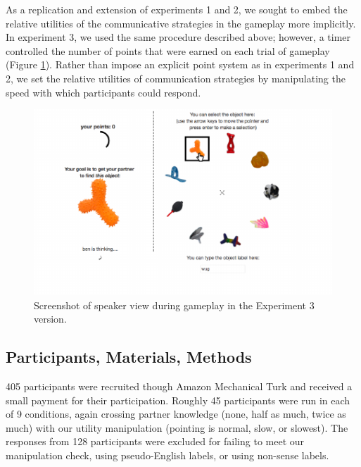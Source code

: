 \documentclass[10pt, letterpaper]{article}
\newenvironment{CodeChunk}{}{}
\begin{document}
As a replication and extension of experiments 1 and 2, we sought to
embed the relative utilities of the communicative strategies in the
gameplay more implicitly. In experiment 3, we used the same procedure
described above; however, a timer controlled the number of points that
were earned on each trial of gameplay (Figure \ref{fig:imp_screenshot}).
Rather than impose an explicit point system as in experiments 1 and 2,
we set the relative utilities of communication strategies by
manipulating the speed with which participants could respond.

\begin{CodeChunk}
\begin{figure}[H]

{\centering \includegraphics{figs/imp_screenshot-1} 

}

\caption[Screenshot of speaker view during gameplay in the Experiment 3 version]{Screenshot of speaker view during gameplay in the Experiment 3 version.}\label{fig:imp_screenshot}
\end{figure}
\end{CodeChunk}

\subsection{Participants, Materials,
Methods}\label{participants-materials-methods-2}

405 participants were recruited though Amazon Mechanical Turk and
received a small payment for their participation. Roughly 45
participants were run in each of 9 conditions, again crossing partner
knowledge (none, half as much, twice as much) with our utility
manipulation (pointing is normal, slow, or slowest). The responses from
128 participants were excluded for failing to meet our manipulation
check, using pseudo-English labels, or using non-sense labels.
\end{document}
